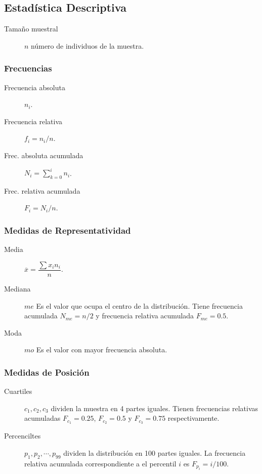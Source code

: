 \documentclass[a4paper]{article}
\newlength{\mylength}
\newenvironment{marco}{
	\setlength{\fboxsep}{5pt}
	\setlength{\mylength}{\textwidth}
	\addtolength{\mylength}{-2\fboxsep}
	\addtolength{\mylength}{-2\fboxrule}
	\noindent
	\begin{Sbox}
	\begin{minipage}{\mylength}
	\setlength{\abovedisplayskip}{3pt}
	\setlength{\belowdisplayskip}{3pt}
}
{
	\end{minipage}
	\end{Sbox}
	\fbox{\TheSbox}
}
\begin{document}
\sloppy 
{}

\footnotesize
\subsection*{Estadística Descriptiva}

\begin{marco}
\begin{multicols}{2}
\begin{description}
\item [Tamaño muestral] $n$ número de individuos de la muestra.
\end{description}
\subsubsection*{Frecuencias}
\begin{description}
\item [Frecuencia absoluta] $n_i$.
\item [Frecuencia relativa] $f_i=n_i/n$.
\item [Frec. absoluta acumulada] $N_i=\sum_{k=0}^in_i$.
\item [Frec. relativa acumulada] $F_i=N_i/n$.
\end{description}
\subsubsection*{Medidas de Representatividad}
\begin{description}
\item [Media] $\overline{x}=\dfrac{\sum x_in_i}{n}$.
\item [Mediana] $me$ Es el valor que ocupa el centro de la distribución. Tiene frecuencia acumulada $N_{me}=n/2$ y frecuencia relativa acumulada $F_{me}=0.5$.
\item [Moda] $mo$ Es el valor con mayor frecuencia absoluta.
\end{description}
\subsubsection*{Medidas de Posición}
\begin{description}
\item [Cuartiles] $c_1,c_2,c_3$ dividen la muestra en 4 partes iguales. Tienen frecuencias relativas acumuladas
$F_{c_1}=0.25$, $F_{c_2}=0.5$ y $F_{c_3}=0.75$ respectivamente.
\item [Percenciltes] $p_1,p_2,\cdots,p_{99}$ dividen la distribución en 100
partes iguales. La frecuencia relativa acumulada correspondiente a el percentil
$i$ es $F_{p_i}=i/100$.
\end{description}

\end{multicols}
\end{marco}
\end{document}
